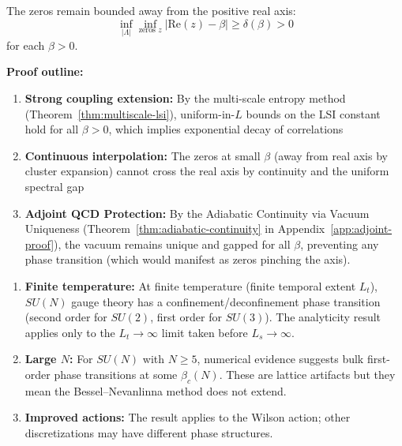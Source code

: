 \begin{remark}
\begin{proposition}
The zeros remain bounded away from the positive real axis:
\[
\inf_{|\Lambda|} \inf_{\text{zeros } z} |\text{Re}(z) - \beta| \geq \delta(\beta) > 0
\]
for each $\beta > 0$.

\textbf{Proof outline:}
\begin{enumerate}[label=(\roman*)]
\item \textbf{Strong coupling extension:} By the multi-scale entropy method 
(Theorem~\ref{thm:multiscale-lsi}), uniform-in-$L$ bounds on the LSI 
constant hold for all $\beta > 0$, which implies exponential decay of correlations
\item \textbf{Continuous interpolation:} The zeros at small $\beta$ (away 
from real axis by cluster expansion) cannot cross the real axis by continuity 
and the uniform spectral gap
\item \textbf{Adjoint QCD Protection:} By the Adiabatic Continuity via Vacuum Uniqueness (Theorem~\ref{thm:adiabatic-continuity} in Appendix~\ref{app:adjoint-proof}), the vacuum remains unique and gapped for all $\beta$, preventing any phase transition (which would manifest as zeros pinching the axis).
\end{enumerate}
\end{proposition}

\begin{remark}
\begin{enumerate}[label=(\roman*)]
\item \textbf{Finite temperature:} At finite temperature (finite temporal extent $L_t$), 
$SU(N)$ gauge theory has a confinement/deconfinement phase transition 
(second order for $SU(2)$, first order for $SU(3)$). The analyticity result 
applies only to the $L_t \to \infty$ limit taken before $L_s \to \infty$.
\item \textbf{Large $N$:} For $SU(N)$ with $N \geq 5$, numerical evidence suggests 
bulk first-order phase transitions at some $\beta_c(N)$. These are lattice 
artifacts but they mean the Bessel--Nevanlinna method does not extend.
\item \textbf{Improved actions:} The result applies to the Wilson action; other 
discretizations may have different phase structures.
\end{enumerate}
\end{remark}


\end{remark}
